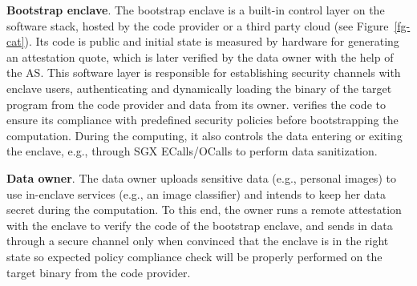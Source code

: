 
\vspace{3pt}\noindent\textbf{Bootstrap enclave}. The bootstrap enclave is a built-in control layer on the software stack, hosted by the code provider or a third party cloud  (see Figure~\ref{fg-cat}). Its code is public and initial state is measured by hardware for generating an attestation quote, which is later verified by the data owner with the help of the AS. This software layer is responsible for establishing security channels with enclave users, authenticating and dynamically loading the binary of the target program from the code provider and data from its owner. \DIFdelbegin {}\DIFdelend \DIFaddbegin {}\DIFaddend verifies the code to ensure its compliance with predefined security policies before bootstrapping the computation. During the computing, it also controls the data entering or exiting the enclave, e.g., through SGX ECalls/OCalls to perform data sanitization.

\vspace{3pt}\noindent\textbf{Data owner}. The data owner uploads sensitive data (e.g., personal images) to use in-enclave services (e.g., an image classifier) and intends to keep her data secret during the computation. To this end, the owner runs a remote attestation with the enclave to verify the code of the bootstrap enclave, and sends in data through a secure channel only when convinced that the enclave is in the right state so expected policy compliance check will be properly performed on the target binary from the code provider. 



